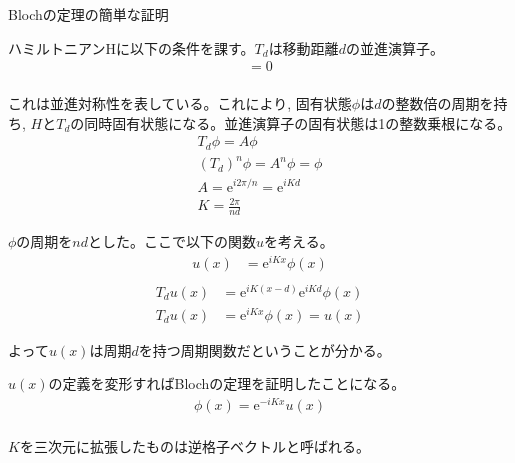 \documentclass[a4paper, lualatex]{bxjsarticle}
\begin{document}
\appendix

\begin{section}{Blochの定理の簡単な証明\label{AppB}}
    \par ハミルトニアンHに以下の条件を課す。$T_d$は移動距離$d$の並進演算子。
    \begin{align}
     [T_d, H]=0\nonumber\\
    \end{align}
    \par これは並進対称性を表している。これにより, 固有状態$\phi$は$d$の整数倍の周期を持ち, $H$と$T_d$の同時固有状態になる。並進演算子の固有状態は1の整数乗根になる。
    \begin{align}
     T_d\phi=A\phi\nonumber\\
        (T_d)^n\phi=A^n\phi=\phi\nonumber\\
        A=\mathrm{e}^{i2\pi/n}=\mathrm{e}^{iKd}\nonumber\\
        K=\frac{2\pi}{n d}
    \end{align}
    \par $\phi$の周期を$nd$とした。ここで以下の関数$u$を考える。
    \begin{align}
     u(x) &= \mathrm{e}^{iKx}\phi(x)\label{ux}\nonumber\\
    \end{align}
    \begin{align}
     T_d u(x) &= \mathrm{e}^{iK(x-d)}\mathrm{e}^{iKd}\phi(x)\nonumber\\
        T_d u(x) &= \mathrm{e}^{iKx}\phi(x)=u(x)
    \end{align}
    \par よって$u(x)$は周期$d$を持つ周期関数だということが分かる。
    \par $u(x)$の定義を変形すればBlochの定理を証明したことになる。
    \begin{align}
     \phi(x) = \mathrm{e}^{-iKx}u(x)\nonumber\\
    \end{align}
    \par $K$を三次元に拡張したものは逆格子ベクトルと呼ばれる。
\end{section}
\end{document}
